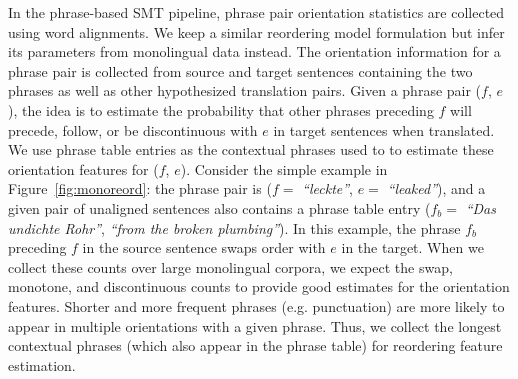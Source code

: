 \documentclass[11pt]{article}
\newcommand{\mnote}[1]{\marginpar{%
  \vskip-\baselineskip
  \raggedright\footnotesize
  \itshape\hrule\smallskip\tiny{#1}\par\smallskip\hrule}}
\newcommand{\mtodo}[1]{\mnote{\textcolor{red}{#1}}}
\newcommand{\figref}[1]{Figure~\ref{#1}}
\newcommand{\emq}[1]{\emph{``#1''}}
\begin{document}
In the phrase-based SMT pipeline, phrase pair orientation statistics are collected using word alignments.  We keep a similar reordering model formulation but infer its parameters from monolingual data instead.  The orientation information for a phrase pair is collected from source and target sentences containing the two phrases as well as other hypothesized translation pairs.  Given a phrase pair ($f$, $e$), the idea is to estimate the probability that other phrases preceding $f$ will precede, follow, or be discontinuous with $e$ in target sentences when translated.  We use phrase table entries as the contextual phrases used to to estimate these orientation features for ($f$, $e$). Consider the simple example in \figref{fig:monoreord}: the phrase pair is ($f =$ \emq{leckte}, $e =$ \emq{leaked}), and a given pair of unaligned sentences also contains a phrase table entry ($f_{b} =$ \emq{Das undichte Rohr}, \emq{from the broken plumbing}).  In this example, the phrase $f_{b}$ preceding $f$ in the source sentence swaps order with $e$ in the target.  When we collect these counts over large monolingual corpora, we expect the swap, monotone, and discontinuous counts to provide good estimates for the orientation features.  
Shorter and more frequent phrases (e.g. punctuation) are more likely to appear in multiple orientations with a given phrase.  Thus, we collect the longest contextual phrases (which also appear in the phrase table) for reordering feature estimation.

\end{document}
